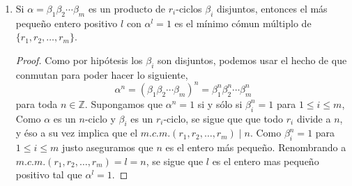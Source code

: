 \documentclass[11pt,letterpaper]{article}
\newcommand{\Z}{\mathbb{Z}}
\begin{document}
\begin{enumerate}[label=\alph*)]
    \item Si $\alpha = \beta_1 \beta_2 \cdots \beta_m$ es un producto de $r_i$-ciclos $\beta_i$ disjuntos, entonces
    el más pequeño entero positivo $l$ con $\alpha^l = 1$ es el mínimo cómun múltiplo de
    $\{ r_1, r_2, \ldots, r_m \}$.
    \begin{proof}
        Como por hipótesis los $\beta_i$ son disjuntos, podemos usar el hecho de que conmutan para poder hacer lo siguiente,
        \[
            \alpha^n = (\beta_1 \beta_2 \cdots \beta_m)^n = \beta_1^n \beta_2^n \cdots \beta_m^n
        \]
        para toda $n \in \Z$. Supongamos que $\alpha^n = 1$ si y sólo si $\beta_i^n = 1$ para $1 \leq i \leq m$,
        Como $\alpha$ es un $n$-ciclo y $\beta_i$ es un $r_i$-ciclo, se sigue que que todo $r_i$ divide a $n$, y éso
        a su vez implica que el $m.c.m.(r_1, r_2, \ldots, r_m) \mid n$. Como $\beta_i^n = 1$ para $1 \leq i \leq m$ 
        justo aseguramos que $n$ es el entero más pequeño. Renombrando a $m.c.m.(r_1, r_2, \ldots, r_m) = l = n$,
        se sigue que $l$ es el entero mas pequeño positivo tal que $\alpha^l = 1$.
    \end{proof}
\end{enumerate}
\end{document}
